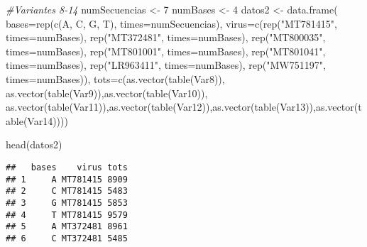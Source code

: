 \documentclass[
]{article}
\newenvironment{Shaded}{\begin{snugshade}}{\end{snugshade}}
\newcommand{\AttributeTok}[1]{\textcolor[rgb]{0.77,0.63,0.00}{#1}}
\newcommand{\CommentTok}[1]{\textcolor[rgb]{0.56,0.35,0.01}{\textit{#1}}}
\newcommand{\DecValTok}[1]{\textcolor[rgb]{0.00,0.00,0.81}{#1}}
\newcommand{\FunctionTok}[1]{\textcolor[rgb]{0.00,0.00,0.00}{#1}}
\newcommand{\NormalTok}[1]{#1}
\newcommand{\OtherTok}[1]{\textcolor[rgb]{0.56,0.35,0.01}{#1}}
\newcommand{\StringTok}[1]{\textcolor[rgb]{0.31,0.60,0.02}{#1}}
\begin{document}
\begin{Shaded}
\begin{Highlighting}[]
\CommentTok{\#Variantes 8{-}14}
\NormalTok{numSecuencias }\OtherTok{\textless{}{-}} \DecValTok{7}
\NormalTok{numBases }\OtherTok{\textless{}{-}} \DecValTok{4}
\NormalTok{datos2 }\OtherTok{\textless{}{-}} \FunctionTok{data.frame}\NormalTok{( }\AttributeTok{bases=}\FunctionTok{rep}\NormalTok{(}\FunctionTok{c}\NormalTok{(}\StringTok{\textquotesingle{}A\textquotesingle{}}\NormalTok{, }\StringTok{\textquotesingle{}C\textquotesingle{}}\NormalTok{, }\StringTok{\textquotesingle{}G\textquotesingle{}}\NormalTok{, }\StringTok{\textquotesingle{}T\textquotesingle{}}\NormalTok{), }\AttributeTok{times=}\NormalTok{numSecuencias),}
                     \AttributeTok{virus=}\FunctionTok{c}\NormalTok{(}\FunctionTok{rep}\NormalTok{(}\StringTok{"MT781415"}\NormalTok{, }\AttributeTok{times=}\NormalTok{numBases),}
                     \FunctionTok{rep}\NormalTok{(}\StringTok{"MT372481"}\NormalTok{, }\AttributeTok{times=}\NormalTok{numBases),}
                     \FunctionTok{rep}\NormalTok{(}\StringTok{"MT800035"}\NormalTok{, }\AttributeTok{times=}\NormalTok{numBases),}
                     \FunctionTok{rep}\NormalTok{(}\StringTok{"MT801001"}\NormalTok{, }\AttributeTok{times=}\NormalTok{numBases),}
                     \FunctionTok{rep}\NormalTok{(}\StringTok{"MT801041"}\NormalTok{, }\AttributeTok{times=}\NormalTok{numBases),}
                     \FunctionTok{rep}\NormalTok{(}\StringTok{"LR963411"}\NormalTok{, }\AttributeTok{times=}\NormalTok{numBases),}
                     \FunctionTok{rep}\NormalTok{(}\StringTok{"MW751197"}\NormalTok{, }\AttributeTok{times=}\NormalTok{numBases)),}
                     \AttributeTok{tots=}\FunctionTok{c}\NormalTok{(}\FunctionTok{as.vector}\NormalTok{(}\FunctionTok{table}\NormalTok{(Var8)), }\FunctionTok{as.vector}\NormalTok{(}\FunctionTok{table}\NormalTok{(Var9)),}\FunctionTok{as.vector}\NormalTok{(}\FunctionTok{table}\NormalTok{(Var10)),}
                     \FunctionTok{as.vector}\NormalTok{(}\FunctionTok{table}\NormalTok{(Var11)),}\FunctionTok{as.vector}\NormalTok{(}\FunctionTok{table}\NormalTok{(Var12)),}\FunctionTok{as.vector}\NormalTok{(}\FunctionTok{table}\NormalTok{(Var13)),}\FunctionTok{as.vector}\NormalTok{(}\FunctionTok{table}\NormalTok{(Var14))))}

\FunctionTok{head}\NormalTok{(datos2)}
\end{Highlighting}
\end{Shaded}

\begin{verbatim}
##   bases    virus tots
## 1     A MT781415 8909
## 2     C MT781415 5483
## 3     G MT781415 5853
## 4     T MT781415 9579
## 5     A MT372481 8961
## 6     C MT372481 5485
\end{verbatim}
\end{document}
